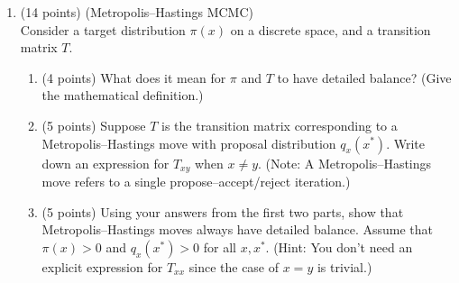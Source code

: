 \documentclass[12pt]{article}
\begin{document}
\begin{enumerate}
\newpage
\item\label{MH} (14 points) (Metropolis--Hastings MCMC)\\
    Consider a target distribution $\pi(x)$ on a discrete space, and a transition matrix $T$.
    \begin{enumerate}
        \item (4 points) What does it mean for $\pi$ and $T$ to have detailed balance? (Give the mathematical definition.)
        \item (5 points) Suppose $T$ is the transition matrix corresponding to a Metropolis--Hastings move with proposal distribution $q_x(x^*)$.
            Write down an expression for $T_{x y}$ when $x\neq y$.
            (Note: A Metropolis--Hastings move refers to a single propose--accept/reject iteration.)
        \item (5 points) Using your answers from the first two parts, show that Metropolis--Hastings moves always have detailed balance.
            Assume that $\pi(x)>0$ and $q_x(x^*)>0$ for all $x,x^*$.
            (Hint: You don't need an explicit expression for $T_{x x}$ since the case of $x = y$ is trivial.)
    \end{enumerate}


    
    
    




















    
\end{enumerate}
\end{document}
